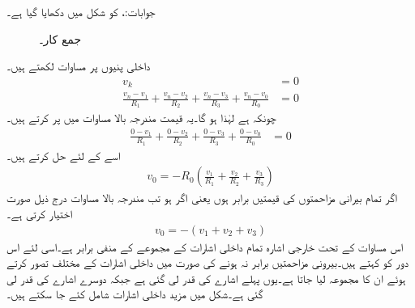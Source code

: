 جوابات:، 
 کو شکل  میں دکھایا گیا ہے۔
\begin{figure}
\centering
{}
\caption{جمع کار۔}
\label{شکل_حسابی_جمع_کار}
\end{figure}
داخلی پنیوں پر مساوات لکھتے ہیں۔
\begin{align*}
v_k&=0\\
\frac{v_n-v_1}{R_1}+\frac{v_n-v_2}{R_2}+\frac{v_n-v_3}{R_3}+\frac{v_n-v_0}{R_0}&=0
\end{align*}
چونکہ  ہے لہٰذا  ہو گا۔یہ قیمت مندرجہ بالا مساوات میں پر کرتے ہیں۔
\begin{align*}
\frac{0-v_1}{R_1}+\frac{0-v_2}{R_2}+\frac{0-v_3}{R_3}+\frac{0-v_0}{R_0}&=0
\end{align*}
اسے  کے لئے حل کرتے ہیں۔
\begin{align}
v_0=-R_0\left(\frac{v_1}{R_1}+\frac{v_2}{R_2}+\frac{v_3}{R_3}\right)
\end{align}
اگر تمام بیرانی مزاحمتوں کی قیمتیں برابر ہوں یعنی اگر  ہو تب مندرجہ بالا مساوات درج ذیل صورت اختیار کرتی ہے۔
\begin{align}
v_0=-\left(v_1+v_2+v_3\right)
\end{align}
اس مساوات کے تحت خارجی اشارہ تمام داخلی اشارات کے مجموعے کے منفی برابر ہے۔اسی لئے اس دور کو  کہتے ہیں۔بیرونی مزاحمتیں برابر نہ ہونے کی صورت میں داخلی اشارات کے  مختلف تصور کرتے ہوئے ان کا مجموعہ لیا جاتا ہے۔یوں پہلے اشارے کی قدر  لی گئی ہے جبکہ دوسرے اشارے کی قدر  لی گئی ہے۔شکل  میں مزید داخلی اشارات شامل کئے جا سکتے ہیں۔


